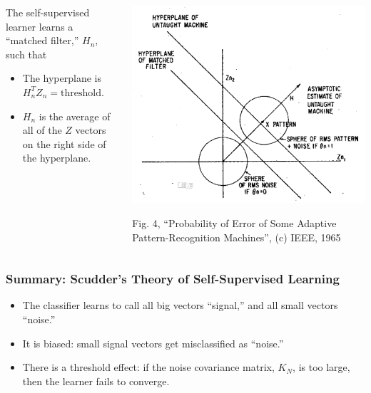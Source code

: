 \documentclass{beamer}
\begin{document}
\begin{frame}
  \begin{columns}
    \begin{column}{0.4\textwidth}

      The self-supervised learner learns a ``matched filter,'' $H_n$,
      such that
      \begin{itemize}
      \item The hyperplane is $H_n^TZ_n = \text{threshold}$.
      \item $H_n$ is the average of all of the $Z$ vectors on the
        right side of the hyperplane.
      \end{itemize}
    \end{column}
    \begin{column}{0.6\textwidth}
      \begin{center}
        \includegraphics[width=\textwidth]{figs/scudder1965fig4.png}

        \begin{tiny}
          Fig. 4, ``Probability of Error of Some Adaptive
          Pattern-Recognition Machines'', (c) IEEE, 1965
        \end{tiny}
      \end{center}
    \end{column}
  \end{columns}
\end{frame}

\begin{frame}
  \frametitle{Summary: Scudder's Theory of Self-Supervised Learning}

  \begin{itemize}
  \item The classifier learns to call all big vectors ``signal,'' and
    all small vectors ``noise.''
  \item It is biased: small signal vectors get misclassified as ``noise.''
  \item There is a threshold effect: if the noise covariance matrix,
    $K_N$, is too large, then the learner fails to converge.
  \end{itemize}
\end{frame}
\end{document}
